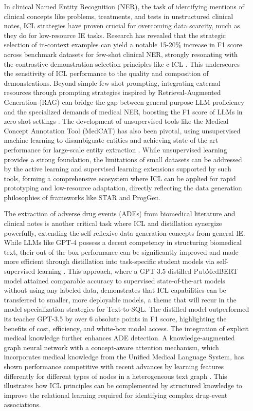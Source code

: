 \documentclass[11pt]{article}
\begin{document}
In clinical Named Entity Recognition (NER), the task of identifying mentions of clinical concepts like problems, treatments, and tests in unstructured clinical notes, ICL strategies have proven crucial for overcoming data scarcity, much as they do for low-resource IE tasks. Research has revealed that the strategic selection of in-context examples can yield a notable 15-20\% increase in F1 score across benchmark datasets for few-shot clinical NER, strongly resonating with the contrastive demonstration selection principles like c-ICL \cite{ref513}. This underscores the sensitivity of ICL performance to the quality and composition of demonstrations. Beyond simple few-shot prompting, integrating external resources through prompting strategies inspired by Retrieval-Augmented Generation (RAG) can bridge the gap between general-purpose LLM proficiency and the specialized demands of medical NER, boosting the F1 score of LLMs in zero-shot settings \cite{ref513}. The development of unsupervised tools like the Medical Concept Annotation Tool (MedCAT) has also been pivotal, using unsupervised machine learning to disambiguate entities and achieving state-of-the-art performance for large-scale entity extraction \cite{ref514}. While unsupervised learning provides a strong foundation, the limitations of small datasets can be addressed by the active learning and supervised learning extensions supported by such tools, forming a comprehensive ecosystem where ICL can be applied for rapid prototyping and low-resource adaptation, directly reflecting the data generation philosophies of frameworks like STAR and ProgGen.

The extraction of adverse drug events (ADEs) from biomedical literature and clinical notes is another critical task where ICL and distillation synergize powerfully, extending the self-reflexive data generation concepts from general IE. While LLMs like GPT-4 possess a decent competency in structuring biomedical text, their out-of-the-box performance can be significantly improved and made more efficient through distillation into task-specific student models via self-supervised learning \cite{ref515}. This approach, where a GPT-3.5 distilled PubMedBERT model attained comparable accuracy to supervised state-of-the-art models without using any labeled data, demonstrates that ICL capabilities can be transferred to smaller, more deployable models, a theme that will recur in the model specialization strategies for Text-to-SQL. The distilled model outperformed its teacher GPT-3.5 by over 6 absolute points in F1 score, highlighting the benefits of cost, efficiency, and white-box model access. The integration of explicit medical knowledge further enhances ADE detection. A knowledge-augmented graph neural network with a concept-aware attention mechanism, which incorporates medical knowledge from the Unified Medical Language System, has shown performance competitive with recent advances by learning features differently for different types of nodes in a heterogeneous text graph \cite{ref516}. This illustrates how ICL principles can be complemented by structured knowledge to improve the relational learning required for identifying complex drug-event associations.
\end{document}
